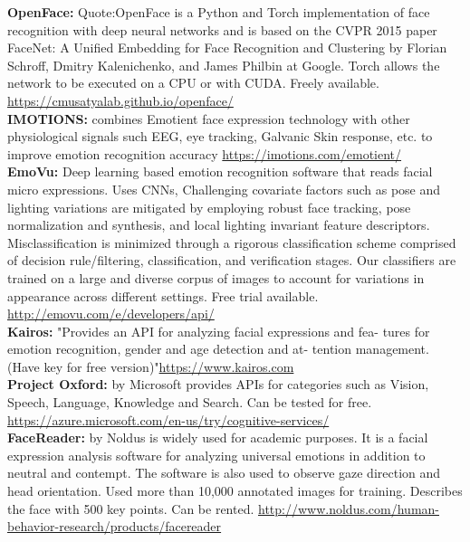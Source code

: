 \textbf{OpenFace:}
Quote:OpenFace is a Python and Torch implementation of face recognition with deep neural networks and is based on the CVPR 2015 paper FaceNet: A Unified Embedding for Face Recognition and Clustering by Florian Schroff, Dmitry Kalenichenko, and James Philbin at Google. Torch allows the network to be executed on a CPU or with CUDA. Freely available. \url{https://cmusatyalab.github.io/openface/}\\

\textbf{IMOTIONS:} combines Emotient face expression technology with other physiological signals such EEG, eye tracking, Galvanic Skin response, etc. to improve emotion recognition accuracy
\url{https://imotions.com/emotient/}\\

\textbf{EmoVu:} Deep learning based emotion recognition software that reads facial micro expressions. Uses CNNs, Challenging covariate factors such as pose and lighting variations are mitigated by employing robust face tracking, pose normalization and synthesis, and local lighting invariant feature descriptors. Misclassification is minimized through a rigorous classification scheme comprised of decision rule/filtering, classification, and verification stages. Our classifiers are trained on a large and diverse corpus of images to account for variations in appearance across different settings. Free trial available.
\url{http://emovu.com/e/developers/api/} \\

\textbf{Kairos:} "Provides an API for analyzing facial expressions and fea- tures for emotion recognition, gender and age detection and at- tention management. (Have key for free version)"\url{https://www.kairos.com}\\

\textbf{Project Oxford:} by Microsoft provides APIs for categories such as Vision, Speech, Language, Knowledge and Search. Can be tested for free.
\url{https://azure.microsoft.com/en-us/try/cognitive-services/}\\

\textbf{FaceReader:} by Noldus is widely used for academic purposes. It is a facial expression analysis software for analyzing universal emotions in addition to neutral and contempt. The software is also used to observe gaze direction and head orientation. Used more than 10,000 annotated images for training. Describes the face with 500 key points. Can be rented. 
\url{http://www.noldus.com/human-behavior-research/products/facereader}\\

